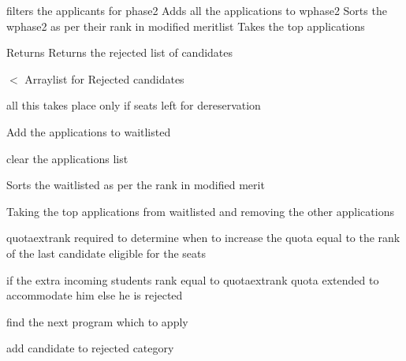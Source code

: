 filters the applicants for phase2 Adds all the applications to wphase2 Sorts the wphase2 as per their rank in modified meritlist Takes the top applications 

\begin{DoxyReturn}{Returns}
Returns the rejected list of candidates 
\end{DoxyReturn}
$<$ Arraylist for Rejected candidates

all this takes place only if seats left for dereservation

Add the applications to waitlisted

clear the applications list

Sorts the waitlisted as per the rank in modified merit

Taking the top applications from waitlisted and removing the other applications

quotaextrank required to determine when to increase the quota equal to the rank of the last candidate eligible for the seats

if the extra incoming students rank equal to quotaextrank quota extended to accommodate him else he is rejected

find the next program which to apply

add candidate to rejected category

